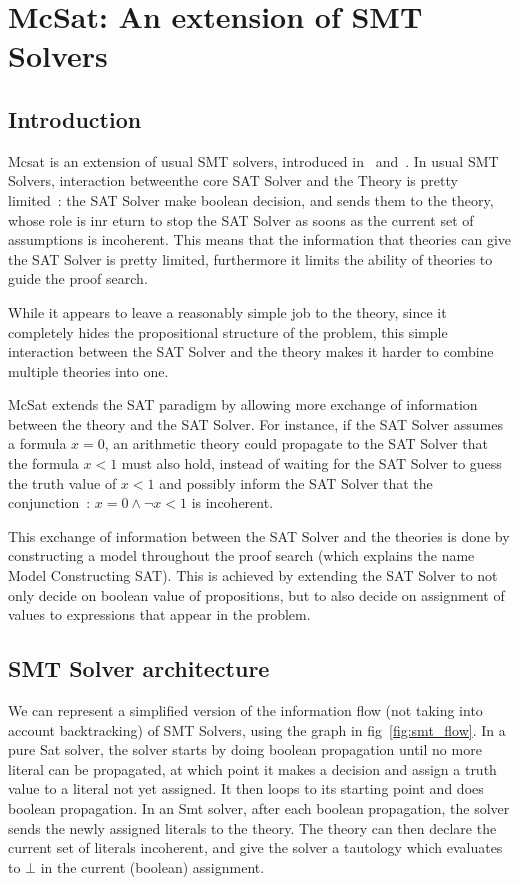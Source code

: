 
\section{McSat: An extension of SMT Solvers}

\subsection{Introduction}


Mcsat is an extension of usual SMT solvers, introduced in~\cite{VMCAI13} and~\cite{FMCAD13}.
In usual SMT Solvers, interaction betweenthe core SAT Solver and the Theory is pretty limited~:
the SAT Solver make boolean decision, and sends them to the theory, whose role is inr eturn to
stop the SAT Solver as soons as the current set of assumptions is incoherent. This means
that the information that theories can give the SAT Solver is pretty limited, furthermore
it limits the ability of theories to guide the proof search.

While it appears to leave a reasonably simple job to the theory, since it completely
hides the propositional structure of the problem, this simple interaction between the
SAT Solver and the theory makes it harder to combine multiple theories into one.

McSat extends the SAT paradigm by allowing more exchange of information between the theory
and the SAT Solver. For instance, if the SAT Solver assumes a formula $x = 0$,
an arithmetic theory could propagate to the SAT Solver that the formula $x < 1$ must also hold,
instead of waiting for the SAT Solver to guess the truth value of $x < 1$ and possibly
inform the SAT Solver that the conjunction~: $x = 0 \land \neg x < 1$ is incoherent.

This exchange of information between the SAT Solver and the theories is done
by constructing a model throughout the proof search (which explains the name
Model Constructing SAT). This is achieved by extending the SAT Solver to not only
decide on boolean value of propositions, but to also decide on assignment of values
to expressions that appear in the problem.

\subsection{SMT Solver architecture}

We can represent a simplified version of the information flow (not taking into
account backtracking) of SMT Solvers, using the graph in fig~\ref{fig:smt_flow}.
In a pure Sat solver, the solver starts by doing
boolean propagation until no more literal can be propagated, at which point it
makes a decision and assign a truth value to a literal not yet assigned. It then
loops to its starting point and does boolean propagation. In an Smt solver,
after each boolean propagation, the solver sends the newly assigned literals
to the theory. The theory can then declare the current set of literals incoherent,
and give the solver a tautology which evaluates to $\bot$ in the current
(boolean) assignment.

